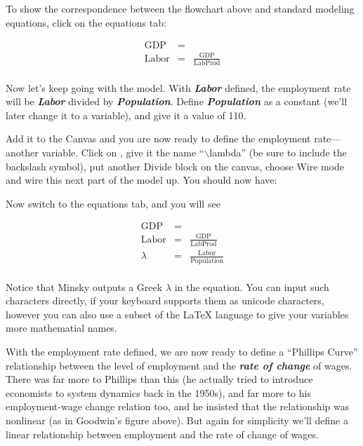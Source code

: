 \begin{center}
\end{center}


To show the correspondence between the flowchart above and standard
modeling equations, click on the equations tab: 

\begin{eqnarray*}
\mathrm{GDP}&=&\\
\mathrm{Labor}&=&\frac{\mathrm{GDP}}{\mathrm{LabProd}}\\
\end{eqnarray*}

Now let's keep going with the model. With {\bf\em Labor} defined, the
employment rate will be {\bf\em  Labor} divided by {\bf\em
Population}. Define {\bf\em Population} as a constant (we'll later
change it to a variable), and give it a value of 110. 

\begin{center}
\end{center}

Add it to the Canvas and you are now ready to define the employment
rate---another variable. Click on , give it
the name ``$\backslash$lambda'' (be sure to include the backslash symbol), put
another Divide block on the canvas, choose Wire mode and wire this
next part of the model up. You should now have:



Now switch to the equations tab, and you will see

\begin{eqnarray*}
\mathrm{GDP}&=&\\
\mathrm{Labor}&=&\frac{\mathrm{GDP}}{\mathrm{LabProd}}\\
\lambda&=&\frac{\mathrm{Labor}}{\mathrm{Population}}\\
\end{eqnarray*}

Notice that Minsky outputs a Greek $\lambda$ in the equation. You can
input such characters directly, if your keyboard supports them as unicode
characters, however you can also use a subset of the LaTeX language to give
your variables more mathematial names.


With the employment rate defined, we are now ready to define a
``Phillips Curve'' relationship between the level of employment and the
{\em\bf rate of change} of wages. There was far more to Phillips than this (he
actually tried to introduce economists to system dynamics back in the
1950s), and far more to his employment-wage change relation too, and
he insisted that the relationship was nonlinear (as in Goodwin's
figure above). But again for simplicity we'll define a linear
relationship between employment and the rate of change of wages. 

